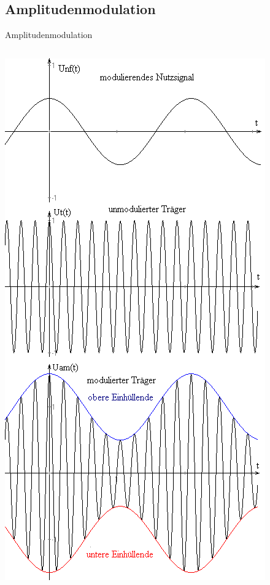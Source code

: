 \subsection[AM]{Amplitudenmodulation}

\begin{frame}{Amplitudenmodulation}
  \begin{columns}[c]
      \includegraphics[width=\textwidth,height=.85\textheight,keepaspectratio]{e14/AM1.png}\\

\end{columns}
\end{frame}
